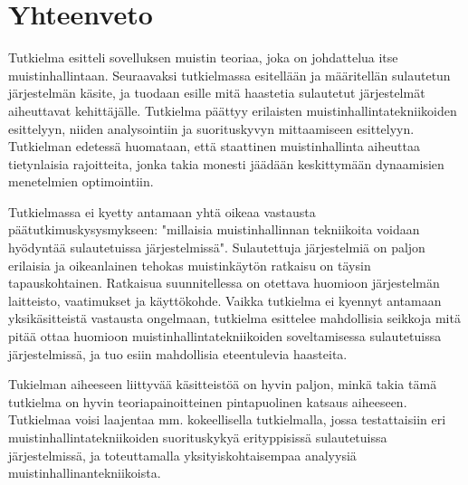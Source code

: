 \chapter{Yhteenveto} \label{Yhteenveto}

Tutkielma esitteli sovelluksen muistin teoriaa, joka on johdattelua itse muistinhallintaan. Seuraavaksi tutkielmassa esitellään ja määritellän sulautetun järjestelmän käsite, ja tuodaan esille mitä haastetia sulautetut järjestelmät aiheuttavat kehittäjälle. Tutkielma päättyy erilaisten muistinhallintatekniikoiden esittelyyn, niiden analysointiin ja suorituskyvyn mittaamiseen esittelyyn. Tutkielman edetessä huomataan, että staattinen muistinhallinta aiheuttaa tietynlaisia rajoitteita, jonka takia monesti jäädään keskittymään dynaamisien menetelmien optimointiin. 

Tutkielmassa ei kyetty antamaan yhtä oikeaa vastausta päätutkimuskysysmykseen: "millaisia muistinhallinnan tekniikoita voidaan hyödyntää sulautetuissa järjestelmissä". Sulautettuja järjestelmiä on paljon erilaisia ja oikeanlainen tehokas muistinkäytön ratkaisu on täysin tapauskohtainen. Ratkaisua suunnitellessa on otettava huomioon järjestelmän laitteisto, vaatimukset ja käyttökohde. Vaikka tutkielma ei kyennyt antamaan yksikäsitteistä vastausta ongelmaan, tutkielma esittelee mahdollisia seikkoja mitä pitää ottaa huomioon muistinhallintatekniikoiden soveltamisessa sulautetuissa järjestelmissä, ja tuo esiin mahdollisia eteentulevia haasteita.

Tukielman aiheeseen liittyvää käsitteistöä on hyvin paljon, minkä takia tämä tutkielma on hyvin teoriapainoitteinen pintapuolinen katsaus aiheeseen. Tutkielmaa voisi laajentaa mm. kokeellisella tutkielmalla, jossa testattaisiin eri muistinhallintatekniikoiden suorituskykyä erityppisissä sulautetuissa järjestelmissä, ja toteuttamalla yksityiskohtaisempaa analyysiä muistinhallinantekniikoista.